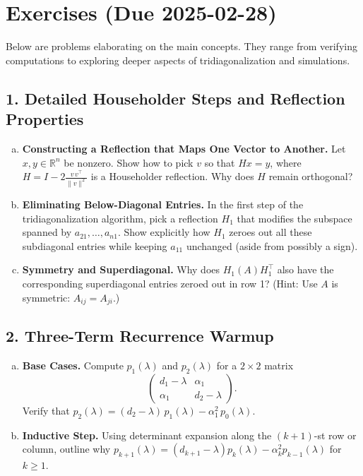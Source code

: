 \documentclass[letterpaper,11pt,oneside,reqno]{article}
\numberwithin{equation}{section}
\theoremstyle{definition}
\begin{document}
\section{Exercises (Due 2025-02-28)}
\label{sec:exercises}

Below are problems elaborating on the main concepts. They range from verifying computations to exploring deeper aspects of tridiagonalization and simulations.

\subsection*{1. Detailed Householder Steps and Reflection Properties}

\begin{enumerate}[(a)]
\item {\bf Constructing a Reflection that Maps One Vector to Another.}
  Let $x,y\in \mathbb{R}^n$ be nonzero. Show how to pick $v$ so that $Hx=y$, where $H=I-2\frac{v\,v^\top}{\|v\|^2}$ is a Householder reflection. Why does $H$ remain orthogonal?
\item {\bf Eliminating Below-Diagonal Entries.}
  In the first step of the tridiagonalization algorithm, pick a reflection $H_1$ that modifies the subspace spanned by $a_{21},\dots,a_{n1}$. Show explicitly how $H_1$ zeroes out all these subdiagonal entries while keeping $a_{11}$ unchanged (aside from possibly a sign).
\item {\bf Symmetry and Superdiagonal.}
  Why does $H_1 (A) H_1^\top$ also have the corresponding superdiagonal entries zeroed out in row 1? (Hint: Use $A$ is symmetric: $A_{ij}=A_{ji}$.)
\end{enumerate}

\subsection*{2. Three-Term Recurrence Warmup}

\begin{enumerate}[(a)]
\item {\bf Base Cases.} Compute $p_1(\lambda)$ and $p_2(\lambda)$ for a $2\times2$ matrix
\[
  \begin{pmatrix}
    d_1-\lambda & \alpha_1 \\
    \alpha_1 & d_2-\lambda
  \end{pmatrix}.
\]
Verify that $p_2(\lambda) = (d_2-\lambda)\,p_1(\lambda) - \alpha_1^2\,p_0(\lambda)$.
\item {\bf Inductive Step.} Using determinant expansion along the $(k+1)$-st row or column, outline why $p_{k+1}(\lambda) = (d_{k+1}-\lambda)p_k(\lambda) - \alpha_k^2 p_{k-1}(\lambda)$ for $k\ge1$.
\end{enumerate}
\end{document}
